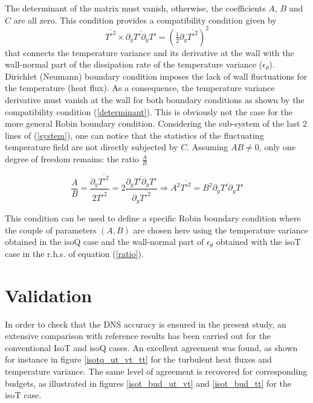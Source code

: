 \documentclass[review]{elsarticle}
\begin{document}
The determinant of the matrix must vanish, otherwise, the coefficients $A$, $B$ and $C$ are all zero. This condition provides a compatibility condition given by %
\begin{equation}\label{determinant}\overline{T'^2} \times \overline{\partial_y T' \partial_y T'} = \left( \tfrac{1}{2}\partial_y \overline{T'^2} \right)^2\end{equation}
that connects the temperature variance and its derivative at the wall with the wall-normal part of the dissipation rate of the temperature variance ($\epsilon_\theta$).
Dirichlet (Neumann) boundary condition imposes the lack of wall fluctuations for the temperature (heat flux).
As a consequence, the temperature variance derivative must vanish at the wall for both boundary conditions as shown by the compatibility condition (\ref{determinant}).
This is obviously not the case for the more general Robin boundary condition.
Considering the sub-system of the last 2 lines of (\ref{system}), one can notice that the statistics of the fluctuating temperature field are not directly subjected by $C$.
Assuming $AB \neq 0$, only one degree of freedom remains: the ratio $\tfrac{A}{B}$%

\begin{equation}\label{ratio}\frac{A}{B} = \frac{\partial_y \overline{T'^2}}{2\overline{T'^2}} = 2 \frac{\overline{\partial_y T' \partial_y T'}}{\partial_y \overline{T'^2}} \Rightarrow A^2 \overline{T'^2} = B^2 \overline{\partial_y T' \partial_y T'} \end{equation}

This condition can be used to define a specific Robin boundary condition where the couple of parameters $(A,B)$ are chosen here using the temperature variance obtained in the isoQ case and the wall-normal part of $\epsilon_\theta$ obtained with the isoT case in the r.h.s. of equation (\ref{ratio}).

\section{Validation}

In order to check that the DNS accuracy is ensured in the present study, an extensive comparison with reference results has been carried out for the conventional IsoT and isoQ cases. An excellent agreement was found, as shown for instance in figure \ref{isotq_ut_vt_tt} for the turbulent heat fluxes and temperature variance. The same level of agreement is recovered for corresponding budgets, as illustrated in figures \ref{isot_bud_ut_vt} and \ref{isot_bud_tt} for the isoT case.
\end{document}
